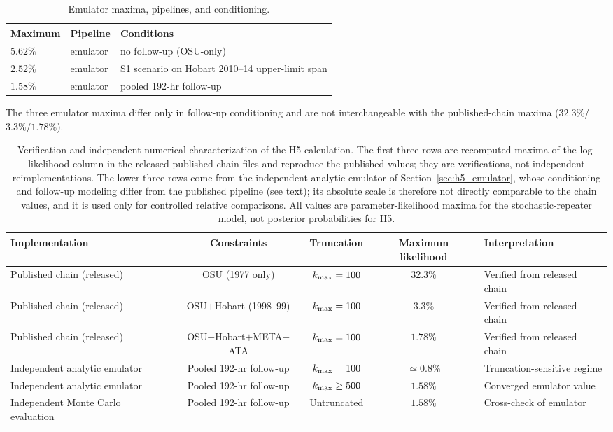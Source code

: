 \documentclass[crop]{CSL}
\newcommand{\kmax}{k_{\rm max}}
\begin{document}
\begin{table}[ht!]
\centering
\caption{Emulator maxima, pipelines, and conditioning.}
\label{tab:emulator_map}
\setlength{\tabcolsep}{4pt}
\begin{tabular}{@{}l l>{\raggedright\arraybackslash}p{}@{}}
\hline Maximum & Pipeline & Conditions \\ \hline\hline
$5.62\%$ & emulator & no follow-up (OSU-only) \\
$2.52\%$ & emulator & S1 scenario on Hobart 2010--14 upper-limit span \\
$1.58\%$ & emulator & pooled 192-hr follow-up \\
\hline
\end{tabular}
\par {\small The three emulator maxima differ only in follow-up conditioning and are not interchangeable with the published-chain maxima ($32.3\%$/$3.3\%$/$1.78\%$).}
\end{table}

\begin{table}[ht!]
\centering
\caption{Verification and independent numerical characterization of the H5 calculation. The first three rows are recomputed maxima of the log-likelihood column in the released published chain files \citep{kipping2022code} and reproduce the published values; they are verifications, not independent reimplementations. The lower three rows come from the independent analytic emulator of Section~\ref{sec:h5_emulator}, whose conditioning and follow-up modeling differ from the published pipeline (see text); its absolute scale is therefore not directly comparable to the chain values, and it is used only for controlled relative comparisons. All values are parameter-likelihood maxima for the stochastic-repeater model, not posterior probabilities for H5.}
\label{tab:h5_recon}
\small
\setlength{\tabcolsep}{4pt}
\begin{tabular}{@{}lccc>{\raggedright\arraybackslash}p{}@{}}
\toprule
Implementation & Constraints & Truncation & Maximum likelihood & Interpretation \\
\midrule
Published chain (released) & OSU (1977 only) & $\kmax=100$ & $32.3\%$ & Verified from released chain \\
Published chain (released) & OSU$+$Hobart (1998--99) & $\kmax=100$ & $3.3\%$ & Verified from released chain \\
Published chain (released) & OSU$+$Hobart$+$META$+$ATA & $\kmax=100$ & $1.78\%$ & Verified from released chain \\
Independent analytic emulator & Pooled 192-hr follow-up & $\kmax=100$ & $\simeq0.8\%$ & Truncation-sensitive regime \\
Independent analytic emulator & Pooled 192-hr follow-up & $\kmax\geq500$ & $1.58\%$ & Converged emulator value \\
Independent Monte Carlo evaluation & Pooled 192-hr follow-up & Untruncated & $1.58\%$ & Cross-check of emulator \\
\bottomrule
\end{tabular}
\end{table}
\end{document}
